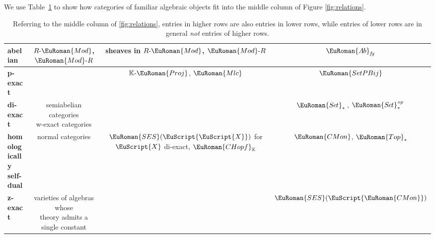 \documentclass [12pt,oneside]{book}%
\theoremstyle{captionstyle}  %
\newcommand{\SetsBsd}{\EuRoman{S{\kern-0.12ex}e{\hskip-0.14ex}t}_{\ast}\,}	%
\newcommand{\SetsBsdOp}{\EuRoman{S{\kern-0.12ex}e{\hskip-0.14ex}t}_{\ast}^{\op}\,}	%
\newcommand{\CMon}{\ensuremath{\EuRoman{CMon}}}
\newcommand{\Mlc}{\ensuremath{\EuRoman{Mlc}}}
\newcommand{\KProj}{\text{$\mathbb{K}$-$\EuRoman{Proj}$}}
\newcommand{\CHopfK}{\EuRoman{CHopf}_\mathbb{K}}
\newcommand{\TopsBsd}{\EuRoman{Top}_{\ast}}	%
\newcommand{\AbGrps}{\EuRoman{A{\kern-0.15ex}b}}	%
\newcommand{\LModules}[1]{{#1}\text{-}\EuRoman{Mod}}    %
\newcommand{\RModules}[1]{\EuRoman{Mod}\text{-}#1}				%
\newcommand{\SetPBij}{\ensuremath{\EuRoman{SetPBij}}} %
\newcommand{\op}{\ensuremath{\mathit{op}}}
\newcommand{\Ctgry}[1]{\EuScript{#1}}					%
\newcommand{\SESCat}[1]{\EuRoman{SES}(\Ctgry{#1})}				%
\begin{document}
We use Table~\ref{tab:Examples2} to show how categories of familiar algebraic objects fit into the middle column of Figure \ref{fig:relations}.

\begin{table}[h!]
    \begin{center}
        {\scriptsize\begin{tabular}{lccc}
                \toprule
                \textbf{abelian}                 & $\LModules{R}$, $\RModules{R}$   & sheaves in $\LModules{R}$, $\RModules{R}$                  & $\AbGrps_{\mathit{fg}}$ \\
                \midrule
                \textbf{p-exact}                 &                                  & $\KProj$, $\Mlc$                                           & $\SetPBij$              \\
                \midrule
                \textbf{di-exact}                & \txt{semiabelian categories                                                                                             \\ w-exact categories}             &             & $\SetsBsd$, $\SetsBsdOp$ \\
                \midrule
                \textbf{homologically self-dual} & normal categories                & {$\SESCat{\Ctgry{X}}$ for $\Ctgry{X}$ di-exact}, $\CHopfK$ & $\CMon$,    $\TopsBsd$  \\
                \midrule
                \textbf{z-exact}                 & \txt{varieties of algebras whose                                                                                        \\ theory admits a single constant}                             &                                                 & $\SESCat{\CMon}$        \\
                \bottomrule
            \end{tabular}}
    \end{center}
    \caption{Referring to the middle column of \ref{fig:relations}, entries in higher rows are also entries in lower rows, while entries of lower rows are in general \emph{not} entries of higher rows.}\label{tab:Examples2}
\end{table}
\end{document}
